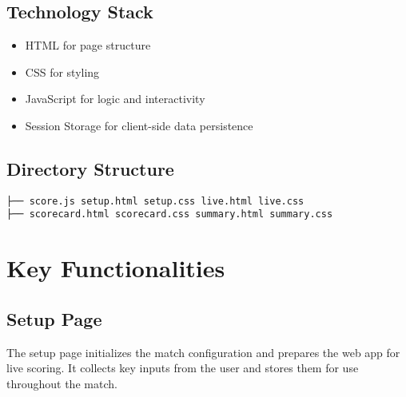 \documentclass[a4paper,10pt]{article}
\begin{document}
\subsection{Technology Stack}
\begin{itemize}
    \item HTML for page structure
    \item CSS for styling
    \item JavaScript for logic and interactivity
    \item Session Storage for client-side data persistence
\end{itemize}

\subsection{Directory Structure}
\begin{verbatim}
├── score.js setup.html setup.css live.html live.css 
├── scorecard.html scorecard.css summary.html summary.css
\end{verbatim}

\section{Key Functionalities}

\subsection{Setup Page}

The setup page initializes the match configuration and prepares the web app for live scoring. It collects key inputs from the user and stores them for use throughout the match.
\end{document}
